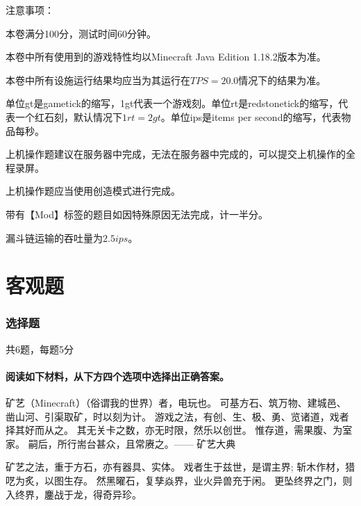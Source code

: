 \documentclass{exampaper}
\date{}
\begin{document}
    \maketitle

    \begin{material}
        \noindent \heiti 注意事项： \songti

        \begin{compactenum}
            \item 本卷满分100分，测试时间60分钟。
            \item 本卷中所有使用到的游戏特性均以Minecraft Java Edition 1.18.2版本为准。
            \item 本卷中所有设施运行结果均应当为其运行在$TPS=20.0$情况下的结果为准。
            \item 单位gt是gametick的缩写，1gt代表一个游戏刻。单位rt是redstonetick的缩写，代表一个红石刻，默认情况下$1rt=2gt$。单位ips是items per second的缩写，代表物品每秒。
            \item 上机操作题建议在服务器中完成，无法在服务器中完成的，可以提交上机操作的全程录屏。
            \item 上机操作题应当使用创造模式进行完成。
            \item 带有【Mod】标签的题目如因特殊原因无法完成，计一半分。
            \item 漏斗链运输的吞吐量为$2.5ips$。
        \end{compactenum}
    \end{material}

    \part{客观题}
        \section{选择题}{共6题，每题5分}
            \subsection{阅读如下材料，从下方四个选项中选择出正确答案。}
                \begin{material}
                    矿艺（Minecraft）（俗谓我的世界）者，电玩也。 可基方石、筑万物、建城邑、凿山河、引渠取矿，时以刻为计。 游戏之法，有创、生、极、勇、览诸道，戏者择其好而从之。 其无关卡之数，亦无时限，然乐以创世。 惟存道，需果腹、为室家。 嗣后，所行耑台甚众，且常赓之。—— 矿艺大典

                    矿艺之法，重于方石，亦有器具、实体。 戏者生于兹世，是谓主界; 斩木作材，猎呓为炙，以图生存。 然黑曜石，复孳焱界，业火异兽充于闲。 更坠终界之门，则入终界，鏖战于龙，得奇异珍。
                \end{material}
\end{document}
